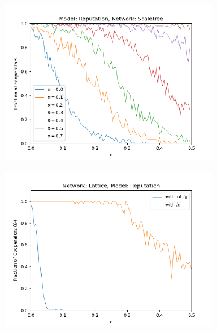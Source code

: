 \documentclass[11pt, A4 paper, twocolumn ]{article}
\begin{document}
\begin{figure}[p]
\begin{subfigure}[b]{0.3\textwidth}
	\includegraphics[width=\textwidth]{graphs/fc_r_varyingp_scalefree}
	\caption{}
	\label{fig:sf-rep}
\end{subfigure}
\begin{subfigure}[b]{0.3\textwidth}
	\centering
	\includegraphics[width=\textwidth]{graphs/lat-fr}
	\caption{}
	\label{fig:lat-fr}
\end{subfigure}
\begin{subfigure}[b]{0.3\textwidth}
	\centering

\end{subfigure}
\end{figure}
\end{document}
